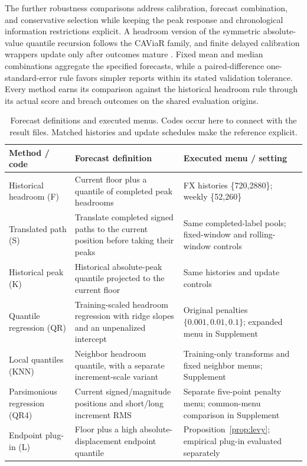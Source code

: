 \documentclass[11pt,a4paper]{article}
\begin{document}
The further robustness comparisons address calibration, forecast combination, and conservative selection while keeping the peak response and chronological information restrictions explicit. A headroom version of the symmetric absolute-value quantile recursion follows the CAViaR family, and finite delayed calibration wrappers update only after outcomes mature \citep{engle2004,gibbs2021}. Fixed mean and median combinations aggregate the specified forecasts, while a paired-difference one-standard-error rule favors simpler reports within its stated validation tolerance. Every method earns its comparison against the historical headroom rule through its actual score and breach outcomes on the shared evaluation origins.


\begin{table}[htbp]\centering\small
\caption{Forecast definitions and executed menus. Codes occur here to connect with the result files. Matched histories and update schedules make the reference explicit.}\label{tab:methods}
\begin{tabular}{>{\raggedright\arraybackslash}p{2.9cm}>{\raggedright\arraybackslash}p{6.0cm}>{\raggedright\arraybackslash}p{5.3cm}}\toprule
Method / code & Forecast definition & Executed menu / setting\\\midrule
Historical headroom (F) & Current floor plus a quantile of completed peak headrooms & FX histories \{720,2880\}; weekly \{52,260\}\\
Translated path (S) & Translate completed signed paths to the current position before taking their peaks & Same completed-label pools; fixed-window and rolling-window controls\\
Historical peak (K) & Historical absolute-peak quantile projected to the current floor & Same histories and update controls\\
Quantile regression (QR) & Training-scaled headroom regression with ridge slopes and an unpenalized intercept & Original penalties $\{0.001,0.01,0.1\}$; expanded menu in Supplement\\
Local quantiles (KNN) & Neighbor headroom quantile, with a separate increment-scale variant & Training-only transforms and fixed neighbor menus; Supplement\\
Parsimonious regression (QR4) & Current signed/magnitude positions and short/long increment RMS & Separate five-point penalty menu; common-menu comparison in Supplement\\
Endpoint plug-in (L) & Floor plus a high absolute-displacement endpoint quantile & Proposition~\ref{prop:levy}; empirical plug-in evaluated separately\\

\end{tabular}
\end{table}
\end{document}
